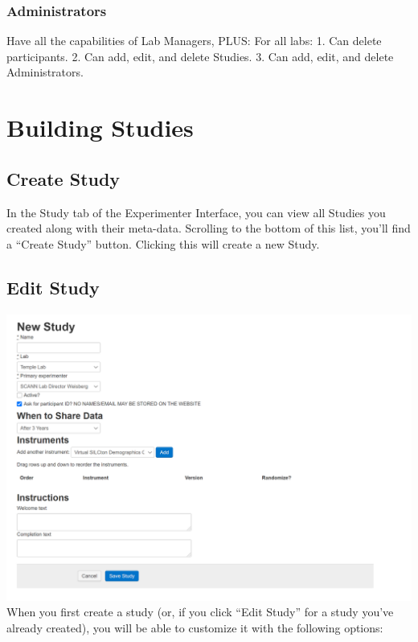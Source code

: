 \documentclass[
  12pt,
]{book}
\begin{document}
\hypertarget{administrators}{%
\subsection{Administrators}\label{administrators}}

Have all the capabilities of Lab Managers, PLUS:
For all labs:
1. Can delete participants.
2. Can add, edit, and delete Studies.
3. Can add, edit, and delete Administrators.

\hypertarget{building-studies}{%
\chapter{Building Studies}\label{building-studies}}

\hypertarget{create-study}{%
\section{Create Study}\label{create-study}}

In the Study tab of the Experimenter Interface, you can view all Studies you created along with their meta-data. Scrolling to the bottom of this list, you'll find a ``Create Study'' button. Clicking this will create a new Study.

\hypertarget{edit-study}{%
\section{Edit Study}\label{edit-study}}

\includegraphics{./figs/web_studies_1.png}
When you first create a study (or, if you click ``Edit Study'' for a study you've already created), you will be able to customize it with the following options:
\end{document}

